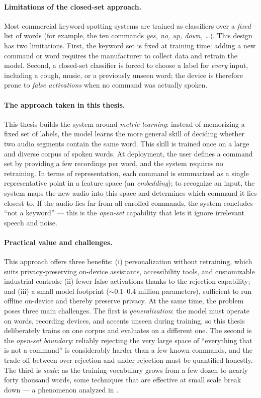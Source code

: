 \documentclass[12pt,a4paper]{report}
\begin{document}
\paragraph{Limitations of the closed-set approach.}
Most commercial keyword-spotting systems are trained as classifiers over a
\emph{fixed} list of words (for example, the ten commands \textit{yes, no, up,
down, \dots}).
This design has two limitations. First, the keyword set is fixed at
training time: adding a new command or word requires the manufacturer to
collect data and retrain the model. Second, a closed-set classifier is forced to
choose a label for \emph{every} input, including a cough, music, or a previously
unseen word; the device is therefore prone to \emph{false activations} when no
command was actually spoken.

\paragraph{The approach taken in this thesis.}
This thesis builds the system around \emph{metric learning}: instead of memorizing
a fixed set of labels, the model learns the more general skill of deciding whether
two audio segments contain the same word. This skill is trained once on a
large and diverse corpus of spoken words. At deployment, the user defines a
command set by providing a few recordings per word, and the system requires
no retraining. In terms of representation, each command is summarized as a single
representative point in a feature space (an \emph{embedding}); to recognize an
input, the system maps the new audio into this space and determines which command
it lies closest to. If the audio lies far from all enrolled commands, the system
concludes ``not a keyword'' --- this is the \emph{open-set} capability that lets
it ignore irrelevant speech and noise.

\paragraph{Practical value and challenges.}
This approach offers three benefits: (i) personalization without retraining,
which suits privacy-preserving on-device assistants, accessibility tools, and
customizable industrial controls; (ii) fewer false activations thanks to the
rejection capability; and (iii) a small model footprint ($\sim$0.1--0.4 million
parameters), sufficient to run offline on-device and thereby preserve privacy.
At the same time, the problem poses three main challenges. The first is
\emph{generalization}: the model must operate on words, recording devices, and
accents unseen during training, so this thesis deliberately trains on one corpus
and evaluates on a different one. The second is the \emph{open-set
boundary}: reliably rejecting the very large space of ``everything that is not a
command'' is considerably harder than a few known commands, and the
trade-off between over-rejection and under-rejection must be quantified honestly.
The third is \emph{scale}: as the training vocabulary grows from a few dozen to
nearly forty thousand words, some techniques that are effective at small scale
break down --- a phenomenon analyzed in .
\end{document}
